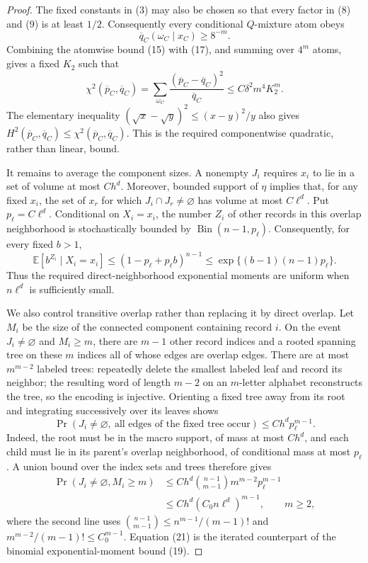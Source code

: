 \documentclass{article}
\begin{document}
\begin{proof}
The fixed constants in (3) may also be chosen so that every factor in (8) and (9) is at least \(1/2\).  Consequently every conditional \(Q\)-mixture atom obeys
\[
 \overline q_C(\omega_C\mid x_C)\ge 8^{-m}.
 \tag{17}
\]
Combining the atomwise bound (15) with (17), and summing over \(4^m\) atoms, gives a fixed \(K_2\) such that
\[
 \chi^2(\overline p_C,\overline q_C)
 =\sum_{\omega_C}\frac{(\overline p_C-\overline q_C)^2}{\overline q_C}
 \le C\delta^2m^4K_2^m.
 \tag{18}
\]
The elementary inequality \((\sqrt{x}-\sqrt{y})^2\le(x-y)^2/y\) also gives \(H^2(\overline p_C,\overline q_C)\le\chi^2(\overline p_C,\overline q_C)\).  This is the required componentwise quadratic, rather than linear, bound.

It remains to average the component sizes.  A nonempty \(J_i\) requires \(x_i\) to lie in a set of volume at most \(Ch^d\).  Moreover, bounded support of \(\eta\) implies that, for any fixed \(x_i\), the set of \(x_r\) for which \(J_i\cap J_r\ne\varnothing\) has volume at most \(C\ell^d\).  Put \(p_\ell=C\ell^d\).  Conditional on \(X_i=x_i\), the number \(Z_i\) of other records in this overlap neighborhood is stochastically bounded by \(\operatorname{Bin}(n-1,p_\ell)\).  Consequently, for every fixed \(b>1\),
\[
 \mathbb E[b^{Z_i}\mid X_i=x_i]
 \le(1-p_\ell+p_\ell b)^{n-1}
 \le\exp\{(b-1)(n-1)p_\ell\}.
 \tag{19}
\]
Thus the required direct-neighborhood exponential moments are uniform when \(n\ell^d\) is sufficiently small.

We also control transitive overlap rather than replacing it by direct overlap.  Let \(M_i\) be the size of the connected component containing record \(i\).  On the event \(J_i\ne\varnothing\) and \(M_i\ge m\), there are \(m-1\) other record indices and a rooted spanning tree on these \(m\) indices all of whose edges are overlap edges.  There are at most \(m^{m-2}\) labeled trees: repeatedly delete the smallest labeled leaf and record its neighbor; the resulting word of length \(m-2\) on an \(m\)-letter alphabet reconstructs the tree, so the encoding is injective.  Orienting a fixed tree away from its root and integrating successively over its leaves shows
\[
 \Pr\!\left(J_i\ne\varnothing,\ \text{all edges of the fixed tree occur}\right)
 \le Ch^d p_\ell^{m-1}.
 \tag{20}
\]
Indeed, the root must be in the macro support, of mass at most \(Ch^d\), and each child must lie in its parent's overlap neighborhood, of conditional mass at most \(p_\ell\).  A union bound over the index sets and trees therefore gives
\[
\begin{split}
 \Pr(J_i\ne\varnothing,M_i\ge m)
 &\le Ch^d\binom{n-1}{m-1}m^{m-2}p_\ell^{m-1}\\
 &\le Ch^d(C_0n\ell^d)^{m-1},\qquad m\ge2,
\end{split}
 \tag{21}
\]
where the second line uses \(\binom{n-1}{m-1}\le n^{m-1}/(m-1)!\) and \(m^{m-2}/(m-1)!\le C_0^{m-1}\).  Equation (21) is the iterated counterpart of the binomial exponential-moment bound (19).


\end{proof}
\end{document}

